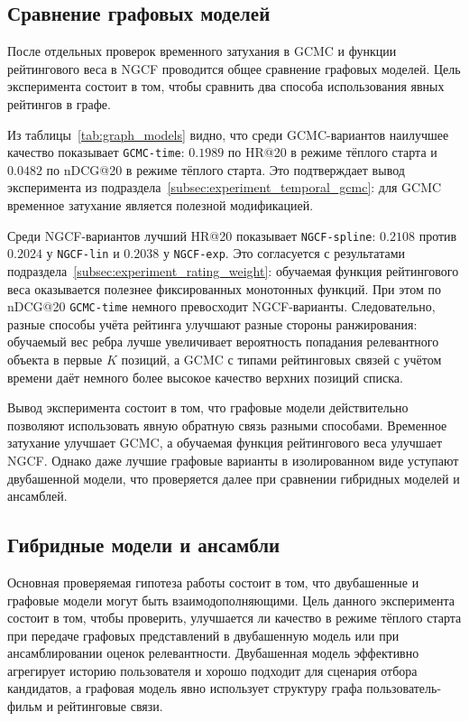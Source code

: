\documentclass[12pt,fleqn]{article}
\begin{document}
\subsection{Сравнение графовых моделей}
\label{subsec:experiment_graph_models}

После отдельных проверок временного затухания в GCMC и функции рейтингового
веса в NGCF проводится общее сравнение графовых моделей. Цель эксперимента состоит в том, чтобы
сравнить два способа использования явных рейтингов в графе.



Из таблицы~\ref{tab:graph_models} видно, что среди GCMC-вариантов наилучшее
качество показывает \texttt{GCMC-time}: $0.1989$ по HR@20 в режиме тёплого старта и $0.0482$ по
nDCG@20 в режиме тёплого старта. Это подтверждает вывод эксперимента
из подраздела~\ref{subsec:experiment_temporal_gcmc}: для GCMC временное
затухание является полезной модификацией.

Среди NGCF-вариантов лучший HR@20 показывает \texttt{NGCF-spline}:
$0.2108$ против $0.2024$ у \texttt{NGCF-lin} и $0.2038$ у \texttt{NGCF-exp}.
Это согласуется с результатами подраздела~\ref{subsec:experiment_rating_weight}:
обучаемая функция рейтингового веса оказывается полезнее фиксированных
монотонных функций. При этом по nDCG@20  \texttt{GCMC-time} немного
превосходит NGCF-варианты. Следовательно, разные способы учёта рейтинга
улучшают разные стороны ранжирования: обучаемый вес ребра лучше увеличивает
вероятность попадания релевантного объекта в первые $K$ позиций, а GCMC с типами рейтинговых связей
с учётом времени даёт немного более высокое качество верхних позиций списка.

Вывод эксперимента состоит в том, что графовые модели действительно позволяют
использовать явную обратную связь разными способами. Временное затухание улучшает
GCMC, а обучаемая функция рейтингового веса улучшает NGCF. Однако даже лучшие
графовые варианты в изолированном виде уступают двубашенной модели, что
проверяется далее при сравнении гибридных моделей и ансамблей.

\subsection{Гибридные модели и ансамбли}
\label{subsec:experiment_hybrid}

Основная проверяемая гипотеза работы состоит в том, что двубашенные и
графовые модели могут быть взаимодополняющими. Цель данного эксперимента состоит в том, чтобы
проверить, улучшается ли качество в режиме тёплого старта при передаче графовых
представлений в двубашенную модель или при ансамблировании оценок релевантности.
Двубашенная модель эффективно агрегирует историю пользователя и хорошо
подходит для сценария отбора кандидатов, а графовая модель явно использует структуру
графа пользователь-фильм и рейтинговые связи.

\end{document}

